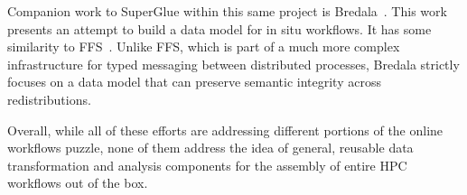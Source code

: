 Companion work to SuperGlue within this same project is
Bredala~\cite{dreher:2016:bredala}. This work presents an attempt to build a
data model for in situ workflows. It has some similarity to
FFS~\cite{eisenhauer:2011:ffs}. Unlike FFS, which is part of a much more
complex infrastructure for typed messaging between distributed processes,
Bredala strictly focuses on a data model that can preserve
semantic integrity across redistributions.

Overall, while all of these efforts are addressing different portions of the
online workflows puzzle, none of them address the idea of general,
reusable data transformation and analysis components for the assembly
of entire HPC workflows out of the box.

